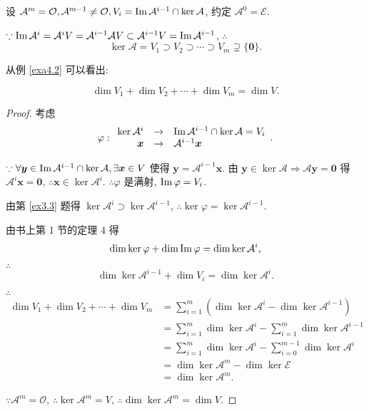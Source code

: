 \documentclass[color=black,device=normal,lang=cn,mode=geye]{elegantnote}
\begin{document}
设 $\mathcal{A}^m=\mathcal{O},\mathcal{A}^{m-1}\neq\mathcal{O},V_i=\operatorname{Im} \mathcal{A}^{i-1}\cap\ker\mathcal{A}$, 约定 $\mathcal{A}^0=\mathcal{E}$.

$\because\operatorname{Im} \mathcal{A}^i=\mathcal{A}^iV=\mathcal{A}^{i-1}\mathcal{A}V\subset\mathcal{A}^{i-1}V=\operatorname{Im} \mathcal{A}^{i-1}$, $\therefore$
\[\ker\mathcal{A}=V_1\supset V_2\supset\cdots\supset V_m\supsetneq\{\boldsymbol{0}\}.\]

从例 \ref{exa4.2} 可以看出:
\begin{lemma}\label{l4.1}
    \[\dim V_1+\dim V_2+\cdots+\dim V_m=\dim V.\]
\end{lemma}
\begin{proof}
    考虑
    \[\varphi:\begin{array}{rcl}
        \ker\mathcal{A}^i & \to & \operatorname{Im} \mathcal{A}^{i-1}\cap\ker\mathcal{A}=V_i \\
        \boldsymbol{x} & \to & \mathcal{A}^{i-1}\boldsymbol{x} \\
    \end{array}.\]

    $\because\forall\boldsymbol{y}\in\operatorname{Im} \mathcal{A}^{i-1}\cap\ker\mathcal{A},\exists\boldsymbol{x}\in V$ 使得 $\boldsymbol{y}=\mathcal{A}^{i-1}\boldsymbol{x}$. 由 $\boldsymbol{y}\in\ker\mathcal{A}\Rightarrow\mathcal{A}\boldsymbol{y}=\boldsymbol{0}$ 得 $\mathcal{A}^i\boldsymbol{x}=\boldsymbol{0}$, $\therefore\boldsymbol{x}\in\ker\mathcal{A}^i$. $\therefore\varphi$ 是满射, $\operatorname{Im} \varphi=V_i$.

    由第 \ref{ex3.3} 题得 $\ker\mathcal{A}^i\supset\ker\mathcal{A}^{i-1}$, $\therefore\ker\varphi=\ker\mathcal{A}^{i-1}$.

    由书上第 1 节的定理 4 得
    \[\dim\ker\varphi+\dim\operatorname{Im} \varphi=\dim\ker\mathcal{A}^i,\]

    $\therefore$
    \begin{equation}\label{eq4.6}
        \dim\ker\mathcal{A}^{i-1}+\dim V_i=\dim\ker\mathcal{A}^i.
    \end{equation}

    $\therefore$
    \begin{align*}
        \dim V_1+\dim V_2+\cdots+\dim V_m & =\sum\limits_{i=1}^m\left(\dim\ker\mathcal{A}^i-\dim\ker\mathcal{A}^{i-1}\right) \\
        & =\sum\limits_{i=1}^m\dim\ker\mathcal{A}^i-\sum\limits_{i=1}^m\dim\ker\mathcal{A}^{i-1} \\
        & =\sum\limits_{i=1}^m\dim\ker\mathcal{A}^i-\sum\limits_{i=0}^{m-1}\dim\ker\mathcal{A}^i \\
        & =\dim\ker\mathcal{A}^m-\dim\ker\mathcal{E} \\
        & =\dim\ker\mathcal{A}^m.
    \end{align*}

    $\because\mathcal{A}^m=\mathcal{O}$, $\therefore\ker\mathcal{A}^m=V$, $\therefore\dim\ker\mathcal{A}^m=\dim V$.
\end{proof}
\end{document}
